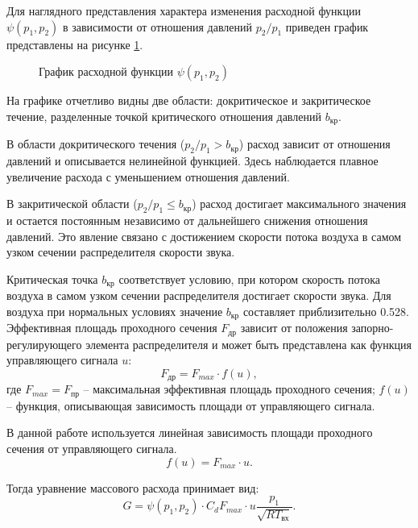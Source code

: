 Для наглядного представления характера изменения расходной функции
$\psi(p_1, p_2)$ в зависимости от отношения давлений $p_2/p_1$
приведен график представлены на рисунке \ref{fig:ch2/mass_flow_function}.
\begin{figure}
	\caption{График расходной функции $\psi(p_1, p_2)$}
	\label{fig:ch2/mass_flow_function}
\end{figure}

На графике отчетливо видны две области: докритическое и закритическое течение, разделенные точкой
критического отношения давлений $b_{кр}$.

В области докритического течения ($p_2/p_1 > b_{кр}$) расход зависит от отношения давлений и
описывается нелинейной функцией. Здесь наблюдается плавное увеличение расхода с уменьшением отношения давлений.

В закритической области ($p_2/p_1 \leq b_{кр}$) расход достигает максимального
значения и остается постоянным независимо от дальнейшего снижения отношения давлений.
Это явление связано с достижением скорости потока воздуха
в самом узком сечении распределителя скорости звука.

Критическая точка $b_{кр}$ соответствует условию, при котором скорость потока
воздуха в самом узком сечении распределителя достигает скорости звука. Для
воздуха при нормальных условиях значение $b_{кр}$ составляет приблизительно \num{0.528}.
Эффективная площадь проходного сечения $F_\text{др}$ зависит от
положения запорно-регулирующего элемента распределителя и может
быть представлена как функция управляющего сигнала $u$:
\begin{equation}
	F_\text{др} = F_{max} \cdot f(u),
\end{equation}
где $F_{max} = F_\text{пр}$ -- максимальная эффективная площадь проходного сечения;
$f(u)$ -- функция, описывающая зависимость площади от управляющего сигнала.

В данной работе используется линейная зависимость площади проходного сечения от управляющего сигнала.
\begin{equation}
	f(u) = F_{max} \cdot u.
\end{equation}

Тогда уравнение массового расхода принимает вид:
\begin{equation}
	\label{eq:ch2/mass_flow}
	G = \psi(p_1, p_2) \cdot C_d F_{max} \cdot u \frac{p_1}{\sqrt{RT_\text{вх}}}.
\end{equation}

